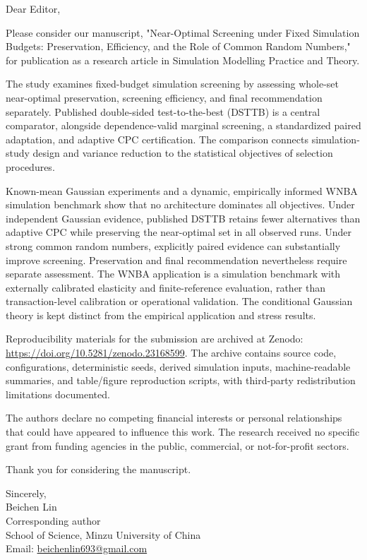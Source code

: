 \documentclass[11pt]{article}
\begin{document}
Dear Editor,

Please consider our manuscript, "Near-Optimal Screening under Fixed Simulation Budgets: Preservation, Efficiency, and the Role of Common Random Numbers," for publication as a research article in Simulation Modelling Practice and Theory.

The study examines fixed-budget simulation screening by assessing whole-set near-optimal preservation, screening efficiency, and final recommendation separately. Published double-sided test-to-the-best (DSTTB) is a central comparator, alongside dependence-valid marginal screening, a standardized paired adaptation, and adaptive CPC certification. The comparison connects simulation-study design and variance reduction to the statistical objectives of selection procedures.

Known-mean Gaussian experiments and a dynamic, empirically informed WNBA simulation benchmark show that no architecture dominates all objectives. Under independent Gaussian evidence, published DSTTB retains fewer alternatives than adaptive CPC while preserving the near-optimal set in all observed runs. Under strong common random numbers, explicitly paired evidence can substantially improve screening. Preservation and final recommendation nevertheless require separate assessment. The WNBA application is a simulation benchmark with externally calibrated elasticity and finite-reference evaluation, rather than transaction-level calibration or operational validation. The conditional Gaussian theory is kept distinct from the empirical application and stress results.

Reproducibility materials for the submission are archived at Zenodo: \url{https://doi.org/10.5281/zenodo.23168599}. The archive contains source code, configurations, deterministic seeds, derived simulation inputs, machine-readable summaries, and table/figure reproduction scripts, with third-party redistribution limitations documented.

The authors declare no competing financial interests or personal relationships that could have appeared to influence this work. The research received no specific grant from funding agencies in the public, commercial, or not-for-profit sectors.

Thank you for considering the manuscript.

Sincerely,\\[4pt]
Beichen Lin\\
Corresponding author\\
School of Science, Minzu University of China\\
Email: \href{mailto:beichenlin693@gmail.com}{beichenlin693@gmail.com}
\end{document}
